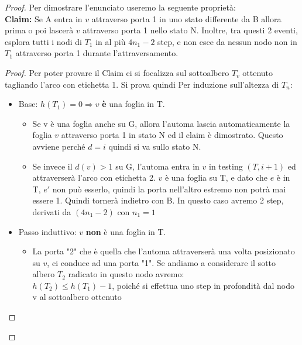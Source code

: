 \begin{proof}
    Per dimostrare l'enunciato useremo la seguente proprietà:\\
    \textbf{Claim: } Se A entra in $v$ attraverso porta 1 in uno stato differente
    da B allora prima o poi lascerà $v$ attraverso porta 1 nello stato N. Inoltre,
    tra questi 2 eventi, esplora tutti i nodi di $T_1$ in al più $4n_1 - 2$ step,
    e non esce da nessun nodo non in $T_1$ attraverso porta 1 durante
    l'attraversamento.
    \begin{proof}
        Per poter provare il Claim ci si focalizza sul sottoalbero $T_v$ ottenuto
        tagliando l'arco con etichetta 1. Si prova quindi Per induzione sull'altezza
        di $T_n$:
        \begin{itemize}
            \item Base: $h(T_1) = 0 \Rightarrow v$ \textbf{è} una foglia in T.
                  \begin{itemize}
                      \item Se v è una foglia anche su G, allora l'automa lascia
                            automaticamente la foglia $v$ attraverso porta 1 in
                            stato N ed il claim è dimostrato. Questo avviene
                            perché $d=i$ quindi si va sullo stato N.
                      \item Se invece il $d(v)>1$ su G, l'automa entra in $v$ in
                            testing $(T, i+1)$ ed attraverserà l'arco con
                            etichetta 2. $v$ è una foglia su T, e dato che $e$ è
                            in T, $e'$ non può esserlo, quindi la porta
                            nell'altro estremo non potrà mai essere 1. Quindi
                            tornerà indietro con B. In questo caso avremo 2
                            step, derivati da $(4n_1 -2)$ con $n_1=1$
                  \end{itemize}
            \item Passo induttivo: $v$ \textbf{non} è una foglia in T.
                  \begin{itemize}
                      \item La porta "2" che è quella che l'automa attraverserà
                            una volta posizionato su $v$, ci conduce ad una
                            porta "1". Se andiamo a considerare il sotto albero
                            $T_2$ radicato in questo nodo avremo:\\
                            $h(T_2) \leq h(T_1) -1$, poiché si effettua uno step
                            in profondità dal nodo v al sottoalbero ottenuto

\end{itemize}
\end{itemize}
\end{proof}
\end{proof}
